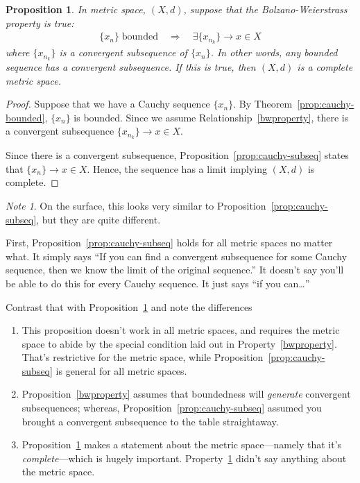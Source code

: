 \documentclass[12pt]{article}
\numberwithin{equation}{section} %
\theoremstyle{plain}
\newtheorem{prop}[thm]{Proposition}
\theoremstyle{definition}
\theoremstyle{remark}
\newtheorem*{note}{Note}
\begin{document}
\begin{prop}
\label{prop:bwproperty}
In metric space, $(X,d)$,
suppose that the \emph{Bolzano-Weierstrass} property is true:
\begin{align}
  \label{bwproperty}
  \{x_n\} \;\text{bounded}
  \quad\Rightarrow\quad
  \exists \{x_{n_k}\}\rightarrow x \in X
\end{align}
where $\{x_{n_k}\}$ is a convergent subsequence of $\{x_n\}$.  In other
words, any bounded sequence has a convergent subsequence. If this is
true, then $(X,d)$ is a complete metric space.
\end{prop}
\begin{proof}
Suppose that we have a Cauchy sequence $\{x_n\}$. By
Theorem~\ref{prop:cauchy-bounded}, $\{x_n\}$ is bounded. Since we assume
Relationship~\ref{bwproperty}, there is a convergent subsequence
$\{x_{n_k}\}\rightarrow x \in X$.

Since there is a convergent subsequence,
Proposition~\ref{prop:cauchy-subseq} states that $\{x_n\}\rightarrow
x\in X$. Hence, the sequence has a limit implying $(X,d)$ is complete.
\end{proof}

\begin{note}
On the surface, this looks very similar to
Proposition~\ref{prop:cauchy-subseq}, but they are quite different.

First, Proposition~\ref{prop:cauchy-subseq} holds for all metric spaces
no matter what. It simply says ``If you can find a convergent
subsequence for some Cauchy sequence, then we know the limit of the
original sequence.'' It doesn't say you'll be able to do this for every
Cauchy sequence. It just says ``if you can\ldots''

Contrast that with Proposition~\ref{prop:bwproperty} and note the
differences
\begin{enumerate}
  \item This proposition doesn't work in all metric spaces, and requires
    the metric space to abide by the special condition laid out in
    Property~\ref{bwproperty}. That's restrictive for the metric space,
    while Proposition~\ref{prop:cauchy-subseq} is general for all metric
    spaces.
  \item Proposition~\ref{bwproperty} assumes that boundedness
    will \emph{generate} convergent subsequences; whereas,
    Proposition~\ref{prop:cauchy-subseq} assumed you brought a
    convergent subsequence to the table straightaway.
  \item Proposition~\ref{prop:bwproperty} makes a statement about the
    metric space---namely that it's \emph{complete}---which is hugely
    important. Property~\ref{prop:bwproperty} didn't say anything about
    the metric space.
\end{enumerate}
\end{note}
\end{document}
